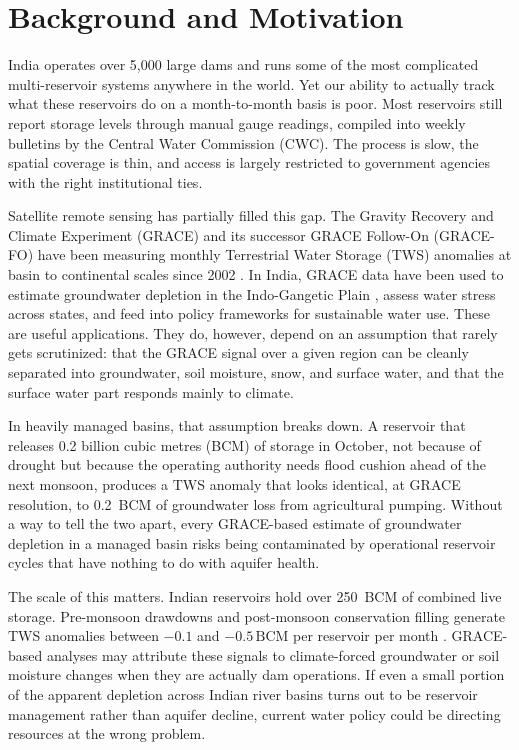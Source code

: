 \documentclass[12pt,a4paper,oneside]{report}
\newcommand{\BCM}{\,\mathrm{BCM}}
\begin{document}
\section{Background and Motivation}

India operates over 5,000 large dams and runs some of the most complicated
multi-reservoir systems anywhere in the world. Yet our ability to actually
track what these reservoirs do on a month-to-month basis is poor. Most
reservoirs still report storage levels through manual gauge readings,
compiled into weekly bulletins by the Central Water Commission (CWC). The
process is slow, the spatial coverage is thin, and access is largely
restricted to government agencies with the right institutional ties.

Satellite remote sensing has partially filled this gap. The Gravity Recovery
and Climate Experiment (GRACE) and its successor GRACE Follow-On (GRACE-FO)
have been measuring monthly Terrestrial Water Storage (TWS) anomalies at
basin to continental scales since 2002 \citep{Tapley2019}. In India, GRACE
data have been used to estimate groundwater depletion in the Indo-Gangetic
Plain \citep{Rodell2009}, assess water stress across states, and feed into
policy frameworks for sustainable water use. These are useful applications.
They do, however, depend on an assumption that rarely gets scrutinized: that
the GRACE signal over a given region can be cleanly separated into
groundwater, soil moisture, snow, and surface water, and that the surface
water part responds mainly to climate.

In heavily managed basins, that assumption breaks down. A reservoir that
releases 0.2 billion cubic metres (BCM) of storage in October, not because
of drought but because the operating authority needs flood cushion ahead of
the next monsoon, produces a TWS anomaly that looks identical, at GRACE
resolution, to 0.2~BCM of groundwater loss from agricultural pumping.
Without a way to tell the two apart, every GRACE-based estimate of
groundwater depletion in a managed basin risks being contaminated by
operational reservoir cycles that have nothing to do with aquifer health.

The scale of this matters. Indian reservoirs hold over 250~BCM of combined
live storage. Pre-monsoon drawdowns and post-monsoon conservation filling
generate TWS anomalies between $-0.1$ and $-0.5\BCM$ per reservoir per
month \citep{Wada2017}. GRACE-based analyses may attribute these signals to
climate-forced groundwater or soil moisture changes when they are actually
dam operations. If even a small portion of the apparent depletion across
Indian river basins turns out to be reservoir management rather than aquifer
decline, current water policy could be directing resources at the wrong
problem.
\end{document}
